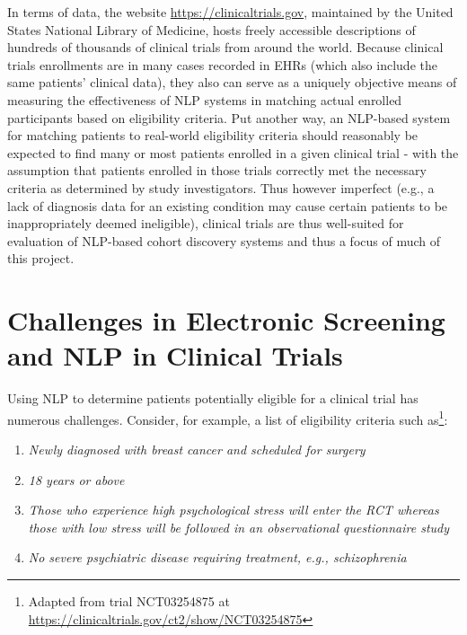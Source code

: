 \documentclass[../main.tex]{subfiles}
\begin{document}
In terms of data, the website \url{https://clinicaltrials.gov}, maintained by the United States National Library of Medicine, hosts freely accessible descriptions of hundreds of thousands of clinical trials from around the world. Because clinical trials enrollments are in many cases recorded in EHRs (which also include the same patients' clinical data), they also can serve as a uniquely objective means of measuring the effectiveness of NLP systems in matching actual enrolled participants based on eligibility criteria. Put another way, an NLP-based system for matching patients to real-world eligibility criteria should reasonably be expected to find many or most patients enrolled in a given clinical trial - with the assumption that patients enrolled in those trials correctly met the necessary criteria as determined by study investigators. Thus however imperfect (e.g., a lack of diagnosis data for an existing condition may cause certain patients to be inappropriately deemed ineligible), clinical trials are thus well-suited for evaluation of NLP-based cohort discovery systems and thus a focus of much of this project.

\section{Challenges in Electronic Screening and NLP in Clinical Trials}

Using NLP to determine patients potentially eligible for a clinical trial has numerous challenges. Consider, for example, a list of eligibility criteria such as\footnote{Adapted from trial NCT03254875 at \url{https://clinicaltrials.gov/ct2/show/NCT03254875}}:

\begin{enumerate}
    \itemsep0em 
    \item \textit{Newly diagnosed with breast cancer and scheduled for surgery}
    \item \textit{18 years or above}
    \item \textit{Those who experience high psychological stress will enter the RCT whereas those with low stress will be followed in an observational questionnaire study}
    \item \textit{No severe psychiatric disease requiring treatment, e.g., schizophrenia}
\end{enumerate}
\end{document}
